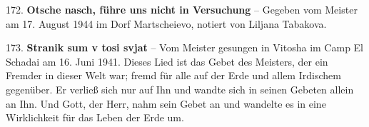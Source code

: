 \documentclass[11pt,a5paper,twoside]{article}
\begin{document}
172. \textbf{Otsche nasch, führe uns nicht in Versuchung} -- Gegeben vom Meister am 17. August 1944 im Dorf Martscheievo, notiert von Liljana Tabakova.

173. \textbf{Stranik sum v tosi svjat }-- Vom Meister gesungen in  Vitosha im Camp  El Schadai am 16. Juni 1941. Dieses Lied ist das Gebet des Meisters, der ein Fremder in dieser Welt war; fremd für alle auf der Erde und allem Irdischem gegenüber. Er verließ sich nur auf Ihn und wandte sich in seinen Gebeten allein an Ihn. Und Gott, der Herr, nahm sein Gebet an und wandelte es in eine Wirklichkeit  für das Leben der Erde um.













 

























 
\end{document}
